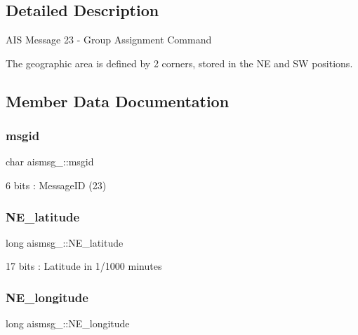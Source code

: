 \subsection{Detailed Description}
A\+IS Message 23 -\/ Group Assignment Command

The geographic area is defined by 2 corners, stored in the NE and SW positions. 

\subsection{Member Data Documentation}
\mbox{\label{structaismsg__23_adc2906d66d6e0e2b2ebb76e6ef5b0b1b}} 
\subsubsection{\texorpdfstring{msgid}{msgid}}
{\footnotesize\ttfamily char aismsg\+\_\+::msgid}



6 bits \+: Message\+ID (23) 

\mbox{\label{structaismsg__23_a3471f451bd9702099dabe115f01bddff}} 
\subsubsection{\texorpdfstring{N\+E\+\_\+latitude}{NE\_latitude}}
{\footnotesize\ttfamily long aismsg\+\_\+::\+N\+E\+\_\+latitude}



17 bits \+: Latitude in 1/1000 minutes 

\mbox{\label{structaismsg__23_a3f871bfde4885f298021af1375f0ee9c}} 
\subsubsection{\texorpdfstring{N\+E\+\_\+longitude}{NE\_longitude}}
{\footnotesize\ttfamily long aismsg\+\_\+::\+N\+E\+\_\+longitude}



